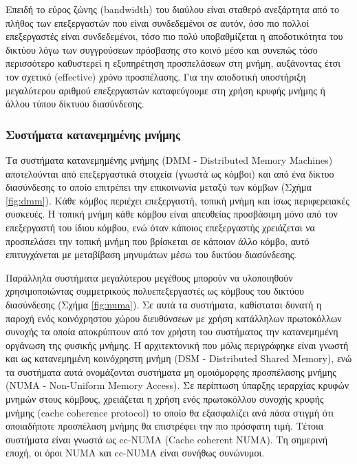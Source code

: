 Επειδή το εύρος ζώνης (bandwidth) του διαύλου είναι σταθερό ανεξάρτητα από το πλήθος των επεξεργαστών που είναι συνδεδεμένοι σε αυτόν, όσο πιο πολλοί επεξεργαστές είναι συνδεδεμένοι, τόσο πιο πολύ υποβαθμίζεται η αποδοτικότητα του δικτύου λόγω των συγγρούσεων πρόσβασης στο κοινό μέσο και συνεπώς τόσο περισσότερο καθυστερεί η εξυπηρέτηση προσπελάσεων στη μνήμη, αυξάνοντας έτσι τον σχετικό (effective) χρόνο προσπέλασης. Για την αποδοτική υποστήριξη μεγαλύτερου αριθμού επεξεργαστών καταφεύγουμε στη χρήση κρυφής μνήμης ή άλλου τύπου δίκτυου διασύνδεσης.

\subsubsection{Συστήματα κατανεμημένης μνήμης}
Τα συστήματα κατανεμημένης μνήμης (DMM - Distributed Memory Machines) αποτελούνται από επεξεργαστικά στοιχεία (γνωστά ως κόμβοι) και από ένα δίκτυο διασύνδεσης το οποίο επιτρέπει την επικοινωνία μεταξύ των κόμβων (Σχήμα \ref{fig:dmm}). Κάθε κόμβος περιέχει επεξεργαστή, τοπική μνήμη και ίσως περιφερειακές συσκευές. Η τοπική μνήμη κάθε κόμβου είναι απευθείας προσβάσιμη μόνο από τον επεξεργαστή του ίδιου κόμβου, ενώ όταν κάποιος επεξεργαστής χρειάζεται να προσπελάσει την τοπική μνήμη που βρίσκεται σε κάποιον άλλο κόμβο, αυτό επιτυγχάνεται με μεταβίβαση μηνυμάτων μέσω του δικτύου διασύνδεσης. 

Παράλληλα συστήματα μεγαλύτερου μεγέθους μπορούν να υλοποιηθούν χρησιμοποιώντας συμμετρικούς πολυεπεξεργαστές ως κόμβους του δικτύου διασύνδεσης (Σχήμα \ref{fig:numa}). Σε αυτά τα συστήματα, καθίσταται δυνατή η παροχή ενός κοινόχρηστου χώρου διευθύνσεων με χρήση κατάλληλων πρωτοκόλλων συνοχής τα οποία αποκρύπτουν από τον χρήστη του συστήματος την κατανεμημένη οργάνωση της φυσικής μνήμης. Η αρχιτεκτονική που μόλις περιγράφηκε είναι γνωστή και ως κατανεμημένη κοινόχρηστη μνήμη (DSM - Distributed Shared Memory), ενώ τα συστήματα αυτά ονομάζονται συστήματα μη ομοιόμορφης προσπέλασης μνήμης (NUMA - Non-Uniform Memory Access). Σε περίπτωση ύπαρξης ιεραρχίας κρυφών μνημών στους κόμβους, χρειάζεται η χρήση ενός πρωτοκόλλου συνοχής κρυφής μνήμης (cache coherence protocol) το οποίο θα εξασφαλίζει ανά πάσα στιγμή ότι οποιαδήποτε προσπέλαση μνήμης θα επιστρέφει την πιο πρόσφατη τιμή. Τέτοια συστήματα είναι γνωστά ως cc-NUMA (Cache coherent NUMA). Τη σημερινή εποχή, οι όροι NUMA και cc-NUMA είναι συνήθως συνώνυμοι.

